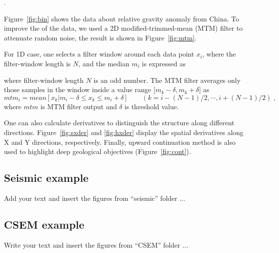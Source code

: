 
.


Figure~\ref{fig:bin} shows the data about relative gravity anomaly
from China. To improve the  
of the data, we used a 2D modified-trimmed-mean (MTM) filter 
 to
attenuate random noise, the result is shown in
Figure~\ref{fig:mtm}.

For 1D case, one selects a filter window around each data point $x_i$,
where the filter-window length is $N$, and the median $m_i$ is expressed
as


where filter-window length $N$ is an odd number. The MTM filter
averages only those samples in the window inside a value range
[$m_k-\delta,m_k+\delta$] as
      \begin{equation}
        \label{eq:eq2}
          mtm_i = mean[x_k|m_i-\delta \le x_k \le m_i+\delta] 
          \qquad (k=i-(N-1)/2,\cdots,i+(N-1)/2)\;,
      \end{equation}
where $mtm$ is MTM filter output and $\delta$ is threshold value. 

One can also calculate derivatives to distinguish the structure along
different directions. Figure~\ref{fig:sxder} and \ref{fig:hxder}
display the spatial derivatives along X and Y directions,
respectively. Finally, upward continuation method is also used to
highlight deep geological objectives (Figure~\ref{fig:cont}).

\subsection{Seismic example}
Add your text and insert the figures from ``seismic'' folder ...

\subsection{CSEM example}
Write your text and insert the figures from ``CSEM'' folder ...








